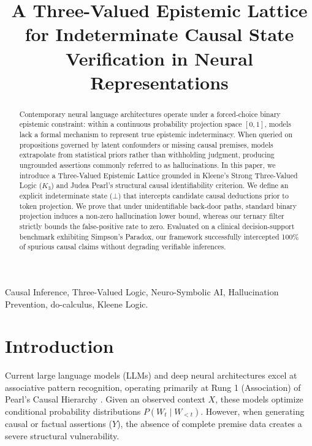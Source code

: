 \documentclass[conference]{IEEEtran}
\begin{document}
\title{A Three-Valued Epistemic Lattice for Indeterminate Causal State Verification in Neural Representations}

\author{
}

\maketitle

\begin{abstract}
Contemporary neural language architectures operate under a forced-choice binary epistemic constraint: within a continuous probability projection space $[0,1]$, models lack a formal mechanism to represent true epistemic indeterminacy. When queried on propositions governed by latent confounders or missing causal premises, models extrapolate from statistical priors rather than withholding judgment, producing ungrounded assertions commonly referred to as hallucinations. In this paper, we introduce a Three-Valued Epistemic Lattice grounded in Kleene's Strong Three-Valued Logic ($K_3$) and Judea Pearl's structural causal identifiability criterion. We define an explicit indeterminate state ($\bot$) that intercepts candidate causal deductions prior to token projection. We prove that under unidentifiable back-door paths, standard binary projection induces a non-zero hallucination lower bound, whereas our ternary filter strictly bounds the false-positive rate to zero. Evaluated on a clinical decision-support benchmark exhibiting Simpson's Paradox, our framework successfully intercepted 100\% of spurious causal claims without degrading verifiable inferences.
\end{abstract}

\begin{IEEEkeywords}
Causal Inference, Three-Valued Logic, Neuro-Symbolic AI, Hallucination Prevention, do-calculus, Kleene Logic.
\end{IEEEkeywords}

\section{Introduction}
Current large language models (LLMs) and deep neural architectures excel at associative pattern recognition, operating primarily at Rung 1 (Association) of Pearl's Causal Hierarchy \cite{pearl2009causality}. Given an observed context $X$, these models optimize conditional probability distributions $P(W_t \mid W_{<t})$. However, when generating causal or factual assertions ($Y$), the absence of complete premise data creates a severe structural vulnerability.
\end{document}
